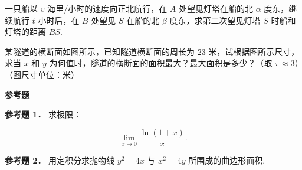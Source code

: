 \begin{question}
一只船以 $v$ 海里/小时的速度向正北航行，在 $A$ 处望见灯塔在船的北 $\alpha$ 度东，继续航行 $t$ 小时后，在 $B$ 处望见 $S$ 在船的北 $\beta$ 度东，求第二次望见灯塔 $S$ 时船和灯塔的距离 $BS$.
\nopagebreak[4]
\begin{center}\end{center}
\nopagebreak[4]
\Needspace{0.4\textheight}
\end{question}
\begin{question}
某隧道的横断面如图所示，已知隧道横断面的周长为 $23$ 米，试根据图所示尺寸，求当 $x$ 和 $y$ 为何值时，隧道的横断面的面积最大？最大面积是多少？（取 $\pi\approx 3$）（图尺寸单位：米）
\nopagebreak[4]
\begin{center}\end{center}
\nopagebreak[4]
\begin{gktip}
\textbf{参考题}
\end{gktip}

\textbf{参考题 1．} 求极限：

\nopagebreak[4]
\[
\lim_{x\to0}\frac{\ln(1+x)}{x}.
\]

\textbf{参考题 2．} 用定积分求抛物线 $y^2=4x$ 与 $x^2=4y$ 所围成的曲边形面积.
\nopagebreak[4]
\begin{center}\end{center}
\nopagebreak[4]

\end{question}
